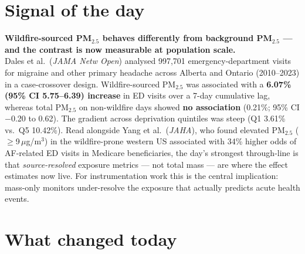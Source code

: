 \documentclass[10pt]{article}
\begin{document}
\vspace{6mm}

\section*{\sffamily\bfseries\color{Deep}Signal of the day}
\vspace{-1.5mm}{\color{Amber}\rule{\linewidth}{1.1pt}}\vspace{2.5mm}

\begin{keybox}
{\sffamily\bfseries\small\color{Deep}Wildfire-sourced PM$_{2.5}$ behaves differently from
background PM$_{2.5}$ --- and the contrast is now measurable at population scale.}\\[1.4mm]
\footnotesize
Dales et al.\ (\textit{JAMA Netw Open}) analysed 997{,}701 emergency-department visits for
migraine and other primary headache across Alberta and Ontario (2010--2023) in a
case-crossover design. Wildfire-sourced PM$_{2.5}$ was associated with a
\textbf{6.07\% (95\% CI 5.75--6.39) increase} in ED visits over a 7-day cumulative lag,
whereas total PM$_{2.5}$ on non-wildfire days showed \textbf{no association}
(0.21\%; 95\% CI $-$0.20 to 0.62). The gradient across deprivation quintiles was steep
(Q1 3.61\% vs.\ Q5 10.42\%). Read alongside Yang et al.\ (\textit{JAHA}), who found
elevated PM$_{2.5}$ ($\geq$9\,$\mu$g/m$^3$) in the wildfire-prone western US associated
with 34\% higher odds of AF-related ED visits in Medicare beneficiaries, the day's
strongest through-line is that \emph{source-resolved} exposure metrics --- not total mass ---
are where the effect estimates now live. For instrumentation work this is the central
implication: mass-only monitors under-resolve the exposure that actually predicts acute
health events.
\end{keybox}

\vspace{3mm}

\section*{\sffamily\bfseries\color{Deep}What changed today}
\vspace{-1.5mm}{\color{Amber}\rule{\linewidth}{1.1pt}}\vspace{2.5mm}
\end{document}
